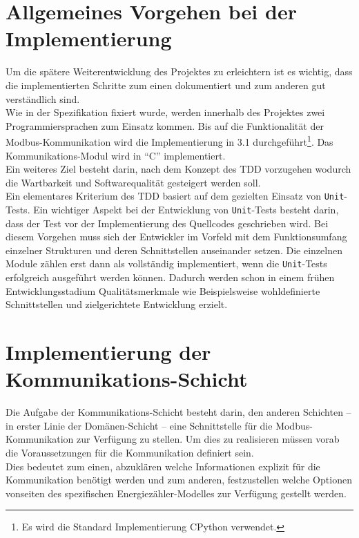 \documentclass[Bachelorarbeit.tex]{subfiles}
\begin{document}
\section{Allgemeines Vorgehen bei der Implementierung}
Um die spätere Weiterentwicklung des Projektes zu erleichtern ist es wichtig, dass die implementierten Schritte zum einen dokumentiert und zum anderen gut verständlich sind. \\
Wie in der Spezifikation fixiert wurde, werden innerhalb des Projektes zwei Programmiersprachen zum Einsatz kommen. Bis auf die Funktionalität der Modbus-Kommunikation wird die Implementierung in 3.1 durchgeführt\footnote{Es wird die Standard Implementierung CPython verwendet.}. Das Kommunikations-Modul wird in "`C"' implementiert.\\ 
Ein weiteres Ziel besteht darin, nach dem Konzept des \ac{TDD} vorzugehen wodurch die Wartbarkeit und Softwarequalität gesteigert werden soll.\\
Ein elementares Kriterium des \ac{TDD} basiert auf dem gezielten Einsatz von \texttt{Unit}-Tests. 
Ein wichtiger Aspekt bei der Entwicklung von \texttt{Unit}-Tests besteht darin, dass der Test vor der Implementierung des Quellcodes geschrieben wird. 
Bei diesem Vorgehen muss sich der Entwickler im Vorfeld mit dem Funktionsumfang einzelner Strukturen und deren Schnittstellen auseinander setzen. 
Die einzelnen Module zählen erst dann als vollständig implementiert, wenn die \texttt{Unit}-Tests erfolgreich ausgeführt werden können. 
Dadurch werden schon in einem frühen Entwicklungsstadium Qualitätsmerkmale wie Beispielsweise wohldefinierte Schnittstellen und zielgerichtete Entwicklung erzielt.\\
%
\begin{comment}
\\Das Resultat der Risikoanalyse hat ergeben, dass die Implementierung der Kommunikation-Schicht am kritischsten eingestuft wird und deshalb als erstes umgesetzt werden sollte. 
\end{comment}
 

\section{Implementierung der Kommunikations-Schicht}
\label{sec:impl_der_kommunikationsschicht}
Die Aufgabe der Kommunikations-Schicht besteht darin, den anderen Schichten – in erster Linie der Domänen-Schicht – eine Schnittstelle für die Modbus-Kommunikation zur Verfügung zu stellen. 
Um dies zu realisieren müssen vorab die Voraussetzungen für die Kommunikation definiert sein.\\
Dies bedeutet zum einen, abzuklären welche Informationen explizit für die Kommunikation benötigt werden und zum anderen, festzustellen welche Optionen vonseiten des spezifischen Energiezähler-Modelles zur Verfügung gestellt werden.
\end{document}
